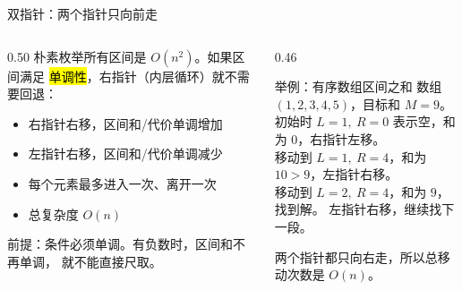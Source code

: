 \documentclass[aspectratio=169]{beamer}
\begin{document}
\begin{frame}{双指针：两个指针只向前走}
    \begin{columns}[T]
        \begin{column}{0.50\textwidth}
            \small
            朴素枚举所有区间是 $O(n^2)$。如果区间满足
            \hl{单调性}，右指针（内层循环）就不需要回退：
            \begin{itemize}
                \item 右指针右移，区间和/代价单调增加
                \item 左指针右移，区间和/代价单调减少
                \item 每个元素最多进入一次、离开一次
                \item 总复杂度 $O(n)$
            \end{itemize}
            \vspace{0.4em}
            前提：条件必须单调。有负数时，区间和不再单调，
            就不能直接尺取。
        \end{column}
        \begin{column}{0.46\textwidth}
            \begin{exampleblock}{举例：有序数组区间之和}
                \footnotesize
                数组 $(1,2,3,4,5)$，目标和 $M=9$。\\
                初始时 $L=1,\ R=0$ 表示空，和为 $0$，右指针左移。\\
                移动到 $L=1,\ R=4$，和为 $10>9$，左指针右移。\\
                移动到 $L=2,\ R=4$，和为 $9$，找到解。
                左指针右移，继续找下一段。
            \end{exampleblock}
            \vspace{0.4em}
            \footnotesize
            两个指针都只向右走，所以总移动次数是 $O(n)$。
        \end{column}
    \end{columns}
\end{frame}
\end{document}
